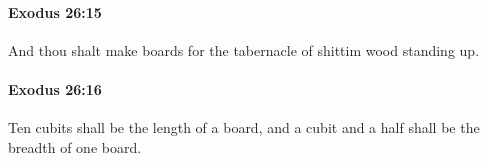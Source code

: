 		\paragraph{Exodus 26:15} %
			\label{EXODUS-26-15}

			And thou shalt make boards for the tabernacle of shittim wood standing up.


		\paragraph{Exodus 26:16} %
			\label{EXODUS-26-16}

			Ten cubits shall be the length of a board, and a cubit and a half shall be the breadth of one board.


